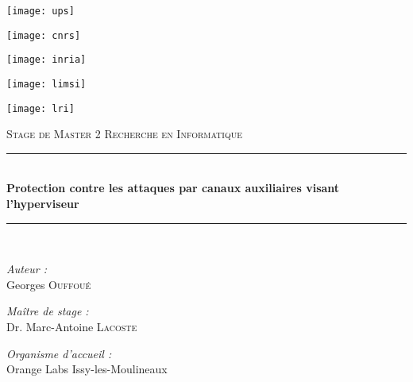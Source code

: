\documentclass[oneside]{memoir}
\newcommand{\HRule}{\rule{\linewidth}{0.5mm}}
\begin{document}
\begin{titlingpage}
 
\begin{center}
 

\texttt{[image: ups]}\\[1cm]

\begin{minipage}{0.2\textwidth}
  \begin{flushleft}
    \texttt{[image: cnrs]}
  \end{flushleft}
\end{minipage}
\begin{minipage}{0.2\textwidth}
  \begin{flushright}
    \texttt{[image: inria]}
  \end{flushright}
\end{minipage}
\begin{minipage}{0.2\textwidth}
 \begin{flushright}
   \texttt{[image: limsi]}
  \end{flushright}
\end{minipage}
\begin{minipage}{0.2\textwidth}
  \begin{flushright}
    \texttt{[image: lri]}
  \end{flushright}
\end{minipage}


\vspace{2cm}  
\textsc{\Large Stage de Master 2 Recherche en Informatique}\\[0.5cm]
 
 
\HRule \\[0.4cm]
{ \huge \bfseries Protection contre les attaques par canaux auxiliaires visant l'hyperviseur}\\[0.4cm]
 
\HRule \\[1.5cm]
 
\begin{minipage}{0.4\textwidth}
\begin{flushleft} \large
\emph{Auteur :}\\
Georges  \textsc{Ouffoué}
\end{flushleft}
\end{minipage}
\begin{minipage}{0.4\textwidth}
\begin{flushright} \large
\emph{Maître de stage :} \\
Dr. Marc-Antoine \textsc{Lacoste}
\end{flushright}
\end{minipage}
\vfill
\emph{Organisme d'accueil : }\\
Orange Labs Issy-les-Moulineaux


\end{center}
\end{titlingpage}
\end{document}
